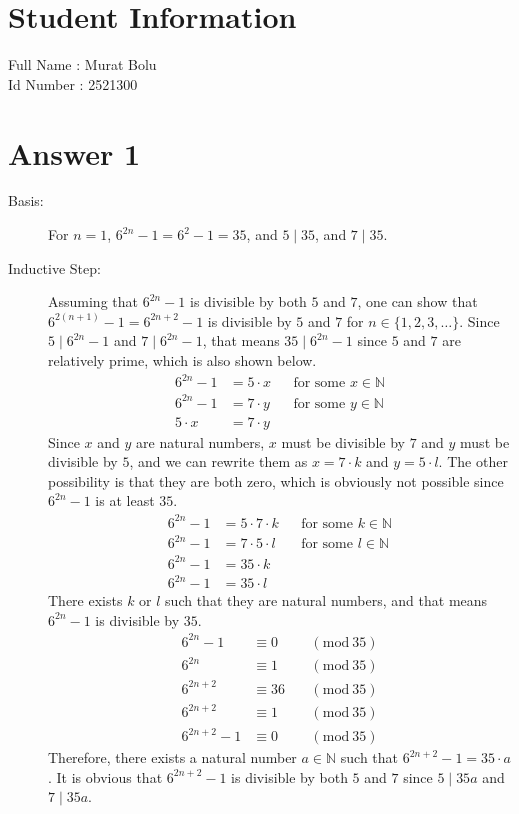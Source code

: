 \documentclass[12pt]{article}
\newcommand{\divides}{\mid}
\newcommand{\Mod}[1]{\ (\mathrm{mod}\ #1)}
\newcommand{\+}{\mkern2mu}
\begin{document}
\section*{Student Information }
Full Name : Murat Bolu \\
Id Number : 2521300 \\

\section*{Answer 1}

\begin{description}
    \item[Basis:] For $n = 1$, $6^{2n} - 1 = 6^2 - 1 = 35$, and $5 \divides 35$, and $7 \divides 35$.
    \item[Inductive Step:] Assuming that $6^{2n} - 1$ is divisible by both $5$ and $7$, one can show that $6^{2(n+1)} - 1 = 6^{2n+2} - 1$ is divisible by $5$ and $7$ for $n \in \{1, 2, 3, \dotsc\}$. Since $5 \divides 6^{2n} - 1$ and $7 \divides 6^{2n} - 1$, that means $35 \divides 6^{2n} - 1$ since $5$ and $7$ are relatively prime, which is also shown below.
    \begin{align*}
        6^{2n} - 1 &= 5 \cdot x && \text{for some $x \in \mathbb{N}$} \\
        6^{2n} - 1 &= 7 \cdot y && \text{for some $y \in \mathbb{N}$} \\
        5 \cdot x &= 7 \cdot y
    \end{align*}
    Since $x$ and $y$ are natural numbers, $x$ must be divisible by $7$ and $y$ must be divisible by $5$, and we can rewrite them as $x = 7 \cdot k$ and $y = 5 \cdot l$. The other possibility is that they are both zero, which is obviously not possible since $6^{2n} - 1$ is at least $35$.
    \begin{align*}
        6^{2n} - 1 &= 5 \cdot 7 \cdot k && \text{for some $k \in \mathbb{N}$} \\
        6^{2n} - 1 &= 7 \cdot 5 \cdot l && \text{for some $l \in \mathbb{N}$} \\
        6^{2n} - 1 &= 35 \cdot k \\
        6^{2n} - 1 &= 35 \cdot l
    \end{align*}
    There exists $k$ or $l$ such that they are natural numbers, and that means $6^{2n} - 1$ is divisible by $35$.
    \begin{align*}
        6^{2n} - 1 &\equiv 0 && \Mod{35} \\
        6^{2n} &\equiv 1 && \Mod{35} \\
        6^{2n+2} &\equiv 36 && \Mod{35} \\
        6^{2n+2} &\equiv 1 && \Mod{35} \\
        6^{2n+2} - 1 & \equiv 0 && \Mod{35}
    \end{align*}
    Therefore, there exists a natural number $a \in \mathbb{N}$ such that $6^{2n+2} - 1 = 35 \cdot a$. It is obvious that $6^{2n+2} - 1$ is divisible by both $5$ and $7$ since $5 \divides 35a$ and $7 \divides 35a$.


\end{description}
\end{document}
